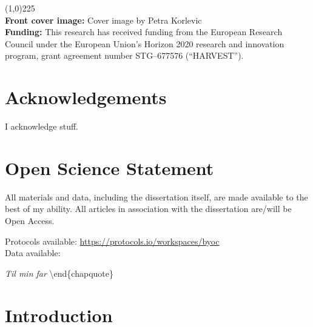 \documentclass[
]{book}
\begin{document}
\begingroup
\hspace{0.000001cm}
\vfill
\begin{flushleft}
\line(1,0){225} \\ %
{\bf Front cover image:} Cover image by Petra Korlevic \\[0.5cm]
{\bf Funding:} This research has received funding from the European Research Council under the European Union's Horizon 2020 research and innovation program, grant agreement number STG--677576 (``HARVEST''). 
\end{flushleft}
\endgroup

\maketitle

{
\setcounter{tocdepth}{1}
\tableofcontents
}
\listoffigures
\listoftables
\hypertarget{acknowledgements}{%
\chapter*{Acknowledgements}\label{acknowledgements}}

I acknowledge stuff.

\hypertarget{open-science-statement}{%
\chapter*{Open Science Statement}\label{open-science-statement}}

All materials and data, including the dissertation itself, are
made available to the best of my ability. All articles in association with the
dissertation are/will be Open Access.

Protocols available: \url{https://protocols.io/workspaces/byoc}\\
Data available:

\clearpage
\thispagestyle{empty}
\vspace*{3cm}

\textit{Til min far}
\textbackslash end\{chapquote\}
\vspace*{\fill}

\mainmatter

\hypertarget{introduction}{%
\chapter{Introduction}\label{introduction}}
\end{document}
